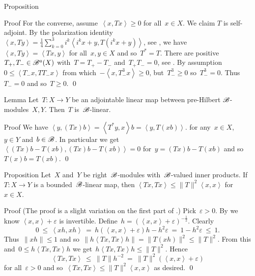 \documentclass[b]{subfiles}
\begin{document}
\begin{parsec}
\begin{point}{Proposition}
\begin{point}{Proof}
For the converse, assume~$\left<x, Tx\right> \geq 0$
    for all~$x \in X$.
We claim $T$ is self-adjoint.
By the polarization identity
$\left<x, Ty\right>
    = \frac{1}{4} \sum^3_{k=0} i^k \left< i^k x+y, T(i^k x+y)\right>$,
    see ,
    we have~$\left<x,Ty \right> = \left<Tx, y\right>$ for all~$x,y \in X$
    and so~$T^*=T$.
There are positive~$T_+,T_- \in \mathscr{B}^a(X)$
with~$T = T_+ - T_-$ and~$T_+T_- = 0$, see .
By assumption~$0 \leq \left<T_-x,TT_-x\right>$
    from which~$-\left<x,T_-^3x\right> \geq 0$,
    but~$T_-^3 \geq 0$ so~$T_-^3 = 0$.
    Thus~$T_- = 0$ and so~$T \geq 0$. \qed
\end{point}
\end{point}
\begin{point}{Lemma}%
Let~$T\colon X \to Y$
    be an adjointable linear map between pre-Hilbert $\mathscr{B}$-modules~$X,Y$.
Then~$T$ is~$\mathscr{B}$-linear.
\begin{point}{Proof}%
We have
    $\left<y, (Tx)b\right>
    =\left<T^*y, x\right>b
    =\left<y, T(xb)\right>$.
for any~$x \in X$, $y \in Y$ and~$b \in \mathscr{B}$.
In particular we
get~$\left<(Tx)b-T(xb), (Tx)b-T(xb)\right>=0$
for~$y = (Tx)b-T(xb)$
    and so~$T(x)b=T(xb)$. \qed
\end{point}
\end{point}
\begin{point}{Proposition}%
Let~$X$ and~$Y$ be right~$\mathscr{B}$-modules with~$\mathscr{B}$-valued
    inner products.
If~$T \colon X \to Y$ is a bounded~$\mathscr{B}$-linear map,
    then $\left<Tx,Tx\right>\leq \|T\|^2 \left<x,x\right>$
    for~$x \in X$.
\begin{point}{Proof}
(The proof is a slight variation on the first part
of \cite[Thm.~2.8]{paschke}.)
Pick~$\varepsilon > 0$.
By 
    we know $\left<x,x\right> + \varepsilon$ is invertible.
Define~$h = (\left<x,x\right> + \varepsilon)^{-\frac{1}{2}}$.
Clearly
\begin{equation*}
0 \ \leq\  \left<xh,xh\right>
    \ =\  h (\left<x,x\right> + \varepsilon)h - h^2 \varepsilon
    \ =\  1 - h^2 \varepsilon \ \leq\  1.
\end{equation*}
Thus~$\|xh\| \leq 1$
and so~$\|h\left<Tx, Tx\right>h\| = \|T(xh)\|^2 \leq \|T\|^2$.
From this and~$0 \leq h\left<Tx,Tx\right>h$
we get~$h\left<Tx,Tx\right>h \leq \|T\|^2$. Hence
\begin{equation*}
\left<Tx,Tx\right> \ \leq \ \|T\| h^{-2}\  =
    \  \|T\|^2(\left<x,x\right> + \varepsilon)
\end{equation*}
for all~$\varepsilon > 0$
and so~$\left<Tx,Tx\right> \leq \|T\|^2 \left<x,x\right>$ as desired. \qed
\end{point}
\end{point}
\end{parsec}
\end{document}
